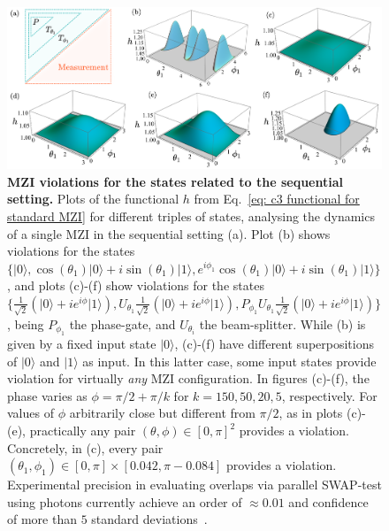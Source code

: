 \documentclass[letterpaper,onecolumn,12pt,accepted=2024-01-17]{article}
\begin{document}
\begin{figure}[ht]
    \includegraphics[width=1\textwidth]{Acc_Figures/doubleMZIgeneralC3andmore.png}
    \caption{\textbf{MZI violations for the states related to the sequential setting.} Plots of the functional $h$ from Eq.~\eqref{eq: c3 functional for standard MZI} for different triples of states, analysing the dynamics of a single MZI in the sequential setting (a). Plot (b) shows violations for the states    $\{\vert 0 \rangle, \cos(\theta_1)\vert 0\rangle + i\sin(\theta_1)\vert 1\rangle, e^{i\phi_1}\cos(\theta_1)\vert 0\rangle + i\sin(\theta_1)\vert 1\rangle\}$, and plots (c)-(f) show violations for the states $\{\frac{1}{\sqrt{2}}(\vert 0\rangle +ie^{i\phi}\vert 1\rangle), U_{\theta_1}\frac{1}{\sqrt{2}}(\vert 0\rangle +ie^{i\phi}\vert 1\rangle), P_{\phi_1}U_{\theta_1}\frac{1}{\sqrt{2}}(\vert 0\rangle +ie^{i\phi}\vert 1\rangle)\}$, being $P_{\phi_1}$ the phase-gate, and $U_{\theta_i}$ the beam-splitter. While (b) is given by a fixed input state $\vert 0 \rangle$, (c)-(f) have different superpositions of $\vert 0 \rangle$ and $\vert 1 \rangle$ as input. In this latter case, some input states provide violation for virtually \textit{any} MZI configuration. In figures (c)-(f), the phase varies as $\phi = \pi/2 + \pi/k$ for $k=150,50,20,5$, respectively. For values of $\phi$ arbitrarily close but different from $\pi/2$, as in plots (c)-(e), practically any pair $(\theta,\phi) \in [0,\pi]^2$ provides a violation. { Concretely, in (c), every pair $(\theta_1,\phi_1) \in [0,\pi]\times [0.042,\pi-0.084]$ provides a violation.} Experimental precision in evaluating overlaps via parallel SWAP-test using photons currently achieve an order of $\approx 0.01$ and confidence of more than $5$ standard deviations~\cite{giordani2021witnessesofcoherence}. }
    \label{fig: violations for any theta and phi}
\end{figure}
\end{document}
